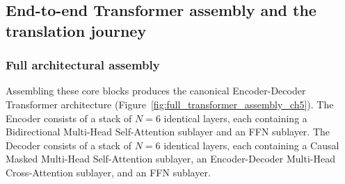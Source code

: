 \documentclass[../../main.tex]{subfiles}
\begin{document}
\subsection{End-to-end Transformer assembly and the translation journey}
\label{subsec:end_to_end_translation_journey}

\subsubsection{Full architectural assembly}
Assembling these core blocks produces the canonical Encoder-Decoder Transformer architecture (Figure~\ref{fig:full_transformer_assembly_ch5}). The Encoder consists of a stack of $N = 6$ identical layers, each containing a Bidirectional Multi-Head Self-Attention sublayer and an FFN sublayer. The Decoder consists of a stack of $N = 6$ identical layers, each containing a Causal Masked Multi-Head Self-Attention sublayer, an Encoder-Decoder Multi-Head Cross-Attention sublayer, and an FFN sublayer.
\end{document}
